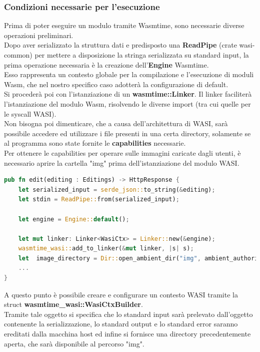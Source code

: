 \subsubsection{Condizioni necessarie per l'esecuzione}
Prima di poter eseguire un modulo tramite Wasmtime, sono necessarie diverse operazioni preliminari.
\\Dopo aver serializzato la struttura dati e predisposto una \textbf{ReadPipe} (crate wasi-common) per mettere a disposizione la stringa serializzata su standard input, la prima operazione necessaria è la creazione dell'\textbf{Engine} Wasmtime.
\\Esso rappresenta un contesto globale per la compilazione e l'esecuzione di moduli Wasm, che nel nostro specifico caso adotterà la configurazione di default.
\\Si procederà poi con l'istanziazione di un \textbf{wasmtime::Linker}. Il linker faciliterà l'istanziazione del modulo Wasm, risolvendo le diverse import (tra cui quelle per le syscall WASI).
\\Non bisogna poi dimenticare, che a causa dell'architettura di WASI, sarà possibile accedere ed utilizzare i file presenti in una certa directory, solamente se al programma sono state fornite le \textbf{capabilities} necessarie. 
\\Per ottenere le capabilities per operare sulle immagini caricate dagli utenti, è necessario aprire la cartella "img" prima dell'istanziazione del modulo WASI.
\begin{lstlisting}[language=rust, caption={File handlers.rs: operazioni preliminari}, showstringspaces=false]
pub fn edit(editing : Editings) -> HttpResponse {
    let serialized_input = serde_json::to_string(&editing);
    let stdin = ReadPipe::from(serialized_input);
    
    let engine = Engine::default();
    
    let mut linker: Linker<WasiCtx> = Linker::new(&engine);
    wasmtime_wasi::add_to_linker(&mut linker, |s| s); 
    let  image_directory = Dir::open_ambient_dir("img", ambient_authority());
    ...
}
\end{lstlisting}
A questo punto è possibile creare e configurare un contesto WASI tramite la struct \textbf{wasmtime\_wasi::WasiCtxBuilder}.
\\Tramite tale oggetto si specifica che lo standard input sarà prelevato dall'oggetto contenente la serializzazione, lo standard output e lo standard error saranno ereditati dalla macchina host ed infine si fornisce una directory precedentemente aperta, che sarà disponibile al percorso "img".

